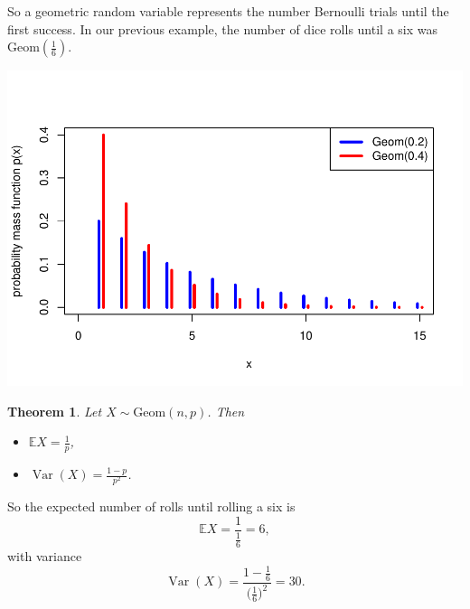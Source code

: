 \documentclass[
  a4paper,
]{book}
\providecommand{\tightlist}{%
  \setlength{\itemsep}{0pt}\setlength{\parskip}{0pt}}
\newtheorem{theorem}{Theorem}[chapter]
\theoremstyle{definition}
\theoremstyle{definition}
\theoremstyle{definition}
\theoremstyle{definition}
\theoremstyle{remark}
\begin{document}
So a geometric random variable represents the number Bernoulli trials until the first success. In our previous example, the number of dice rolls until a six was \(\text{Geom}(\frac16)\).

\includegraphics{math1710_files/figure-latex/geom-pic-1.pdf}

\begin{theorem}

Let \(X \sim \text{Geom}(n, p)\). Then

\begin{itemize}
\tightlist
\item
  \(\mathbb EX = \displaystyle\frac1p\),
\item
  \(\operatorname{Var}(X) = \displaystyle\frac{1-p}{p^2}\).
\end{itemize}

\end{theorem}

So the expected number of rolls until rolling a six is
\[ \mathbb EX = \frac{1}{\frac16} = 6 , \]
with variance
\[ \operatorname{Var}(X) = \frac{1 - \frac16}{\big(\frac16\big)^2} = 30 . \]
\end{document}
